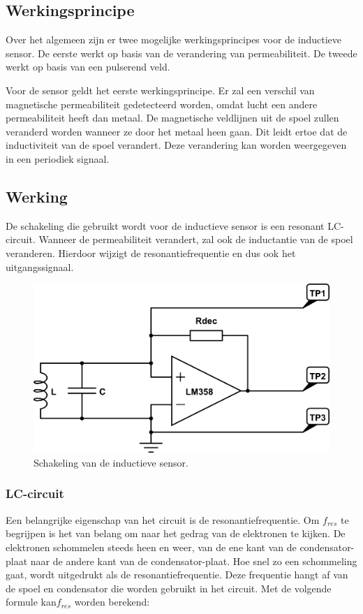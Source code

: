 \documentclass{report}
\begin{document}
\subsection{Werkingsprincipe}
\label{ssec:werking}
Over het algemeen zijn er twee mogelijke werkingsprincipes voor de inductieve sensor. De eerste werkt op basis van de verandering van permeabiliteit. De tweede werkt op basis van een pulserend veld. 

Voor de sensor geldt het eerste werkingsprincipe. Er zal een verschil van magnetische permeabiliteit gedetecteerd worden, omdat lucht een andere permeabiliteit heeft dan metaal. De magnetische veldlijnen uit de spoel zullen veranderd worden wanneer ze door het metaal heen gaan. Dit leidt ertoe dat de inductiviteit van de spoel verandert. Deze verandering kan worden weergegeven in een periodiek signaal.

\newpage
\subsection{Werking}

De schakeling die gebruikt wordt voor de inductieve sensor is een resonant LC-circuit. Wanneer de permeabiliteit verandert, zal ook de inductantie van de spoel veranderen. Hierdoor wijzigt de resonantiefrequentie en dus ook het uitgangssignaal.

\begin{figure}[H]
\centering
\includegraphics[scale=0.45]{inductieve_sensor.png}
\caption{Schakeling van de inductieve sensor.}
\label{fig:schakeling_sensor}
\end{figure}

\subsubsection{LC-circuit}
Een belangrijke eigenschap van het circuit is de resonantiefrequentie. Om $f_{res}$ te begrijpen is het van belang om naar het gedrag van de elektronen te kijken. De elektronen schommelen steeds heen en weer, van de ene kant van de condensator-plaat naar de andere kant van de condensator-plaat. Hoe snel zo een schommeling gaat, wordt uitgedrukt als de resonantiefrequentie. Deze frequentie hangt af van de spoel en condensator die worden gebruikt in het circuit. Met de volgende formule kan$f_{res}$ worden berekend:
\end{document}
